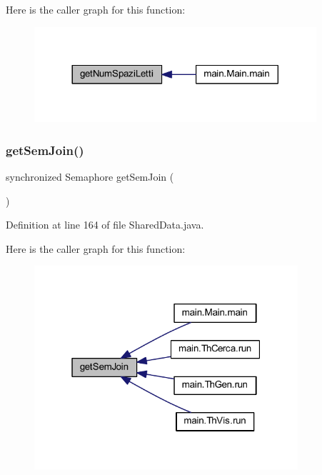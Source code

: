 Here is the caller graph for this function\+:
\nopagebreak
\begin{figure}[H]
\begin{center}
\leavevmode
\includegraphics[width=296pt]{classmain_1_1_shared_data_a54eb961c8dee642d24f9e725eb039827_icgraph}
\end{center}
\end{figure}
\mbox{\label{classmain_1_1_shared_data_a853d0d6001de0c0e8f81c9ab5020c292}} 
\subsubsection{\texorpdfstring{get\+Sem\+Join()}{getSemJoin()}}
{\footnotesize\ttfamily synchronized Semaphore get\+Sem\+Join (\begin{DoxyParamCaption}{ }\end{DoxyParamCaption})}



Definition at line 164 of file Shared\+Data.\+java.

Here is the caller graph for this function\+:
\nopagebreak
\begin{figure}[H]
\begin{center}
\leavevmode
\includegraphics[width=277pt]{classmain_1_1_shared_data_a853d0d6001de0c0e8f81c9ab5020c292_icgraph}
\end{center}
\end{figure}
\mbox{\label{classmain_1_1_shared_data_a3635e525daf3f0e52187d20e37c90f68}} 
